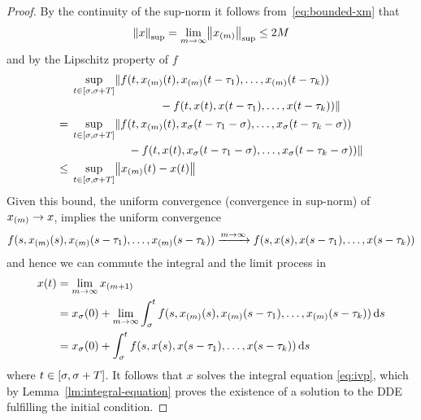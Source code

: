 \begin{proof}
        By the continuity of the sup-norm it follows from~\eqref{eq:bounded-xm} that
        \begin{equation*}
            \supnorm*{x}=\lim_{m\to\infty}\supnorm*{\seq{x}{m}}\leq 2M
        \end{equation*}
        and by the Lipschitz property of $f$
        \begin{align*}
            &\!\begin{multlined}[t][0.8\displaywidth]
                \sup_{t\in\compactum{\tzero}{\tzero+T}}\lVert f(t,\seq{x}{m}(t),\seq{x}{m}(t-\tau_1),\ldots,\seq{x}{m}(t-\tau_k))\\
                -f(t,x(t),x(t-\tau_1),\ldots,x(t-\tau_k))\rVert
            \end{multlined}\\
            ={} &\!\begin{multlined}[t][0.8\displaywidth]
                \sup_{t\in\compactum{\tzero}{\tzero+T}}\lVert f(t,\seq{x}{m}(t),x_{\tzero}(t-\tau_1-\tzero),\ldots,x_{\tzero}(t-\tau_k-\tzero))\\
                -f(t,x(t),x_{\tzero}(t-\tau_1-\tzero),\ldots,x_{\tzero}(t-\tau_k-\tzero))\rVert
            \end{multlined}\\
            \leq{} &\sup_{t\in\compactum{\tzero}{\tzero+T}}\nnorm*{\seq{x}{m}(t)-x(t)}
        \end{align*}
        Given this bound, the uniform convergence (convergence in sup-norm) of $\seq{x}{m}\to x$, implies the uniform convergence
        \begin{equation*}
            f(s,\seq{x}{m}(s),\seq{x}{m}(s-\tau_1),\ldots,\seq{x}{m}(s-\tau_k)) \xrightarrow{m\to\infty} f(s,x(s),x(s-\tau_1),\ldots,x(s-\tau_k))
        \end{equation*}
        and hence we can commute the integral and the limit process in
        \begin{align*}
            x(t) &= \lim_{m\to\infty} \seq{x}{m+1}\\
            &= x_\tzero(0) + \lim_{m\to\infty}\integral{\tzero}{t} f(s,\seq{x}{m}(s),\seq{x}{m}(s-\tau_1),\ldots,\seq{x}{m}(s-\tau_k))\dx[s]\\
            &= x_\tzero(0) + \integral{\tzero}{t} f(s,x(s),x(s-\tau_1),\ldots,x(s-\tau_k))\dx[s]
        \end{align*}
        where $t\in\compactum{\tzero}{\tzero+T}$.
        It follows that $x$ solves the integral equation \eqref{eq:ivp}, which by Lemma~\ref{lm:integral-equation} proves the existence of a solution to the DDE fulfilling the initial condition.


\end{proof}
